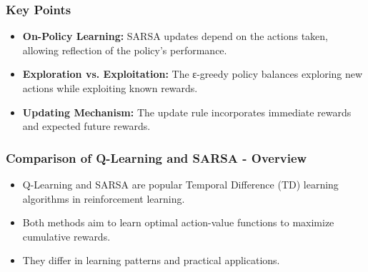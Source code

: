 \documentclass[aspectratio=169]{beamer}
\begin{document}
\begin{frame}[fragile]
    \frametitle{Key Points}
    \begin{itemize}
        \item \textbf{On-Policy Learning:} SARSA updates depend on the actions taken, allowing reflection of the policy's performance.
        \item \textbf{Exploration vs. Exploitation:} The ε-greedy policy balances exploring new actions while exploiting known rewards.
        \item \textbf{Updating Mechanism:} The update rule incorporates immediate rewards and expected future rewards.
    \end{itemize}
\end{frame}

\begin{frame}[fragile]
    \frametitle{Comparison of Q-Learning and SARSA - Overview}
    \begin{itemize}
        \item Q-Learning and SARSA are popular Temporal Difference (TD) learning algorithms in reinforcement learning.
        \item Both methods aim to learn optimal action-value functions to maximize cumulative rewards.
        \item They differ in learning patterns and practical applications.
    \end{itemize}
\end{frame}
\end{document}

